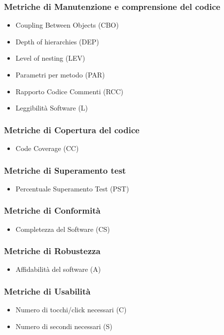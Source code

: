 \subsubsection{Metriche di Manutenzione e comprensione del codice}
\begin{itemize}
	\item Coupling Between Objects (CBO)
	\item Depth of hierarchies (DEP)
	\item Level of nesting (LEV)
	\item Parametri per metodo (PAR)
	\item Rapporto Codice Commenti (RCC)
	\item Leggibilità Software (L)
\end{itemize}
\subsubsection{Metriche di Copertura del codice}
\begin{itemize}
	\item Code Coverage (CC)
\end{itemize}
\subsubsection{Metriche di Superamento test}
\begin{itemize}
	\item Percentuale Superamento Test (PST)
\end{itemize}
\subsubsection{Metriche di Conformità}
\begin{itemize}
	\item Completezza del Software (CS)
\end{itemize}
\subsubsection{Metriche di Robustezza}
\begin{itemize}
	\item Affidabilità del software (A)
\end{itemize}
\subsubsection{Metriche di Usabilità}
\begin{itemize}
	\item Numero di tocchi/click necessari (C)
	\item Numero di secondi necessari (S)
\end{itemize}